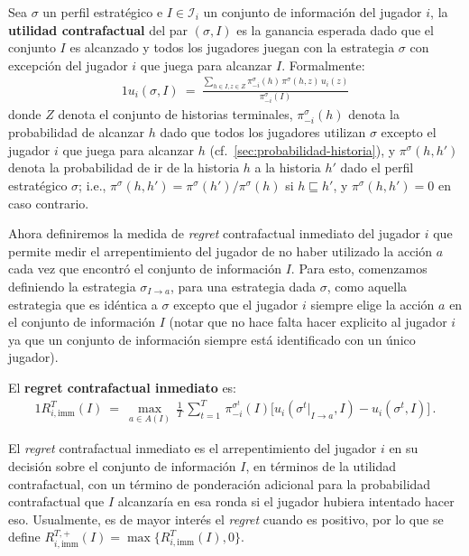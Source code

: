 \begin{definition}
\label{def:utilidad-contrafactual}
Sea $\sigma$ un perfil estratégico e $I \in \mathcal{I}_i$ un conjunto de información del jugador $i$, la \textbf{utilidad contrafactual} del par $(\sigma,I)$ es la ganancia esperada dado que el conjunto $I$ es alcanzado y todos los jugadores juegan con la estrategia $\sigma$ con excepción del jugador $i$ que juega para alcanzar $I$. Formalmente: 
\begin{alignat}{1}
u_i(\sigma, I)\ =\ \frac{\sum_{h \in I, z \in Z} \pi^\sigma_{-i}(h)\, \pi^\sigma(h, z)\, u_i(z)}{\pi^\sigma_{-i}(I)}
\end{alignat}
donde $Z$ denota el conjunto de historias terminales, $\pi^\sigma_{-i}(h)$ denota la probabilidad de alcanzar $h$ dado que todos los jugadores utilizan $\sigma$ excepto el jugador $i$ que juega para alcanzar $h$ (cf.\ \ref{sec:probabilidad-historia}), y $\pi^\sigma(h,h')$ denota la probabilidad de ir de la historia $h$ a la historia $h'$ dado el perfil estratégico $\sigma$; i.e., $\pi^\sigma(h,h')=\pi^\sigma(h')/\pi^\sigma(h)$ si $h \sqsubseteq h'$, y $\pi^\sigma(h, h') = 0$ en caso contrario.
\end{definition}

Ahora definiremos la medida de \emph{regret} contrafactual inmediato del jugador $i$ que permite medir el arrepentimiento del jugador de no haber utilizado la acción $a$ cada vez que encontró el conjunto de información $I$. Para esto, comenzamos definiendo la estrategia $\sigma_{I\rightarrow a}$, para una estrategia dada $\sigma$, como aquella estrategia que es idéntica a $\sigma$ excepto que el jugador $i$ siempre elige la acción $a$ en el conjunto de información $I$ (notar que no hace falta hacer explicito al jugador $i$ ya que un conjunto de información siempre está identificado con un único jugador).

\begin{definition}
\label{def:regret-inmediato}
El \textbf{regret contrafactual inmediato} es:
\begin{alignat}{1}
R_{i, \text{imm}}^T(I)\ =\  \max_{a \in A(I)} \, \frac{1}{T} \, \sum_{t = 1}^T \, \pi^{\sigma^t}_{-i}(I) \biggl[ u_i(\sigma^t|_{I \rightarrow a}, I) - u_i(\sigma^t, I) \biggr]\,.
\end{alignat}
\end{definition}

El \textit{regret} contrafactual inmediato es el arrepentimiento del jugador $i$ en su decisión sobre el conjunto de información $I$, en términos de la utilidad contrafactual, con un término de ponderación adicional para la probabilidad contrafactual que $I$ alcanzaría en esa ronda si el jugador hubiera intentado hacer eso. Usualmente, es de mayor interés el \textit{regret} cuando es positivo, por lo que se define $R_{i, \text{imm}}^{T, +} (I) = \max\{R^T_{i, \text{imm}} (I), 0\}$. 

